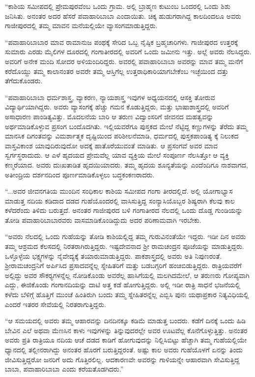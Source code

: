  “ಕಾಶಿಯ ಸಮೀಪದಲ್ಲಿ ಪ್ರೇಮಪುರವೆಂಬ ಒಂದು ಗ್ರಾಮ. ಅಲ್ಲಿ ಬ್ರಾಹ್ಮಣ ಕುಟುಂಬ ಒಂದರಲ್ಲಿ ಒಂದು ಶಿಶು ಜನಿಸಿತು. ಅನಂತರ ಅದರ ಹೆಸರೆ ಪವಾಹಾರಿಬಾಬಾ ಎಂದಾಯಿತು. ಚಿಕ್ಕ ಹುಡುಗರಾಗಿದ್ದ ಕಾಲದಿಂದಲೂ ಅವರು ಗಾಜೀಪುರದಲ್ಲಿ ತಮ್ಮ ಮಾವನ ಮನೆಯಲ್ಲಿಯೇ ವ್ಯಾಸಂಗಮಾಡುತ್ತಿದ್ದರು.

 “ಪವಾಹಾರಿಬಾಬಾರ ಮಾವ ರಾಮಾನುಜ ಪಂಥಕ್ಕೆ ಸೇರಿದ ಒಬ್ಬ ನೈಷ್ಠಿಕ ಬ್ರಹ್ಮಚಾರಿಗಳು. ಗಾಜೀಪುರದ ಉತ್ತರಕ್ಕೆ ಸುಮಾರು ಎರಡು ಮೈಲಿಗಳ ದೂರದಲ್ಲಿ ಗಂಗಾತೀರದಲ್ಲಿ ಅವರಿಗೆ ಒಂದು ಜಮೀನು ಇತ್ತು. ಅಲ್ಲೆ ಅವರು ನೆಲಸಿದ್ದರು. ಅವರಿಗೆ ಅನೇಕ ಮಂದಿ ಸೋದರ ಅಳಿಯಂದಿರಿದ್ದರು. ಅವರಲ್ಲಿ ಪವಾಹಾರಿಬಾಬಾ ಅವರನ್ನು ಮಾವ ತಮ್ಮ ಮನೆಗೆ ಕರೆದೊಯ್ದು ತಮ್ಮ ಕಾಲಾನಂತರ ಅವರೇ ತಮ್ಮ ಆಸ್ತಿಗೆಲ್ಲ ಉತ್ತರಾಧಿಕಾರಿಯಾಗಬೇಕೆಂಬ ಇಚ್ಛೆಯಿಂದ ದತ್ತು ತೆಗೆದುಕೊಂಡರು.

 “ಪವಾಹಾರಿಬಾಬಾ ಧರ್ಮಶಾಸ್ತ್ರ, ವ್ಯಾಕರಣ, ನ್ಯಾಯಶಾಸ್ತ್ರ ಇವುಗಳ ಅಧ್ಯಯನದಲ್ಲಿ ಆಸಕ್ತಿ ತೋರುವ ವಿದ್ಯಾರ್ಥಿಯಾಗಿದ್ದರು. ಅವರು ವ್ಯಾಸಂಗಕ್ಕೆ ಹೆಚ್ಚು ಗಮನ ಕೊಡುತ್ತಿದ್ದರು, ಮತ್ತು ಭಾಷಾಶಾಸ್ತ್ರದಲ್ಲಿ ಅವರಿಗೆ ಅಸಾಧಾರಣ ಪಾಂಡಿತ್ಯವಿತ್ತು. ಮೊದಲನೆಯ ಬಾರಿ ಆ ತರುಣ ವಿದ್ವಾಂಸರಿಗೆ ಜೀವನದ ಮಹತ್ವವನ್ನು ಅರ್ಥಮಾಡಿಕೊಳ್ಳುವ ಪ್ರಸಂಗ ಬಂದೊದಗಿತು. ಇಲ್ಲಿಯವರೆಗೂ ಪುಸ್ತಕದ ಮೇಲೆ ನೆಟ್ಟಿದ್ದ ಕಣ್ಣುಗಳನ್ನು ತೆರೆದು ತಮ್ಮ ಮಾನಸಿಕ ದಿಗಂತವನ್ನು ವಿಮರ್ಶಾತ್ಮಕ ದೃಷ್ಟಿಯಿಂದ ಪರಿಶೀಲನೆಮಾಡಿ, ಧರ್ಮದಲ್ಲಿ ಪುಸ್ತಕಪಾಂಡಿತ್ಯ ಕ್ಕೆ ನಿಲುಕದ ವಾಸ್ತವಿಕಾಂಶ ಯಾವುದಿರುವುದೋ ಅದಕ್ಕೆ ಹಾತೊರೆಯುವಂತೆ ಮಾಡಿತು. ಆ ಪ್ರಸಂಗವೆ ಅವರ ಮಾವ ಸ್ವರ್ಗಸ್ಥರಾದುದು. ಆ ಎಳೆ ಹೃದಯದ ಪ್ರೇಮವೆಲ್ಲ ಯಾವ ವ್ಯಕ್ತಿಯ ಮೇಲೆ ಸಂಪೂರ್ಣ ನೆಲಸಿತ್ತೋ ಆ ವ್ಯಕ್ತಿ ಕಣ್ಮರೆಯಾದ. ಅವರು ದುಃಖತಾಡಿತ ಹೃದಯಿಯಾದರು. ತಮ್ಮ ಹೃದಯ ಶೂನ್ಯತೆಯನ್ನು ಎಂದೆಂದಿಗೂ ನಾಶವಾಗದ, ಅತೀಂದ್ರಿಯ ದರ್ಶನದಿಂದ ಪೂರ್ಣಮಾಡಿಕೊಳ್ಳಲು ಬದ್ಧಕಂಕಣರಾದರು.

 “...ಅವರ ಜೀವನಗತಿಯ ಮುಂದಿನ ಸಂಧಿಕಾಲ ಕಾಶಿಯ ಸಮೀಪದ ಗಂಗಾ ತೀರದಲ್ಲಿದೆ. ಅಲ್ಲಿ ಯೋಗಾಭ್ಯಾಸ ಮಾಡುತ್ತ ನದಿಯ ಕಡಿದಾದ ದಡದ ಗುಹೆಯೊಂದರಲ್ಲಿ ವಾಸಿಸುತ್ತಿದ್ದ ಸಂನ್ಯಾಸಿಯೊಬ್ಬರ ಶಿಷ್ಯರಾಗಿ ಕೆಲವು ಕಾಲ ಕಳೆದರೆಂದು ತಿಳಿದು ಬರುತ್ತದೆ. ಅನಂತರ ಗಾಜೀಪುರದ ಬಳಿ ಗಂಗಾತೀರದ ನೆಲದಲ್ಲಿ ಒಂದು ದೊಡ್ಡ ಗುಂಡಿಯನ್ನು ತೋಡಿ ಪವಾಹಾರಿಬಾಬಾರವರು ವಾಸಮಾಡಿಕೊಂಡಿದ್ದುದು ಅದರ ಪರಿಣಾಮವಾಗಿ ಇರಬೇಕು.

 “ಅವರು ನೆಲದಲ್ಲಿ ಒಂದು ಗುಹೆಯನ್ನು ತೋಡಿ ಕಾಶಿಯಲ್ಲಿದ್ದ ತಮ್ಮ ಗುರುವಿನಂತೆಯೇ ಇದ್ದರು. ಇಡೀ ದಿನ ಅವರು ತಮ್ಮ ಆಶ್ರಮದ ಕೆಲಸದಲ್ಲಿ ನಿರತರಾಗಿರುತ್ತಿದ್ದರು. ಇಷ್ಟದೇವನಾದ ಶ‍್ರೀ ರಾಮಚಂದ್ರನ ಪೂಜೆಯನ್ನು ಮಾಡುತ್ತಿದ್ದರು. ಒಳ್ಳೊಳ್ಳೆಯ ಭಕ್ಷ್ಯಗಳನ್ನು ನೈವೇದ್ಯಕ್ಕೆ ತಯಾರುಮಾಡುತ್ತಿದ್ದರು. ಪಾಕಶಾಸ್ತ್ರದಲ್ಲಿ ಅವರು ಅತಿ ನಿಪುಣರಂತೆ. ಶ‍್ರೀರಾಮಚಂದ್ರನಿಗೆ ಅರ್ಪಿಸಿದ ಪ್ರಸಾದವನ್ನೆಲ್ಲ ಸ್ನೇಹಿತರಿಗೆ ಮತ್ತು ಬಡಬಗ್ಗರಿಗೆ ಹಂಚಿಬಿಡುತ್ತಿದ್ದರು. ರಾತ್ರಿಯವರೆಗೆ ಅಲ್ಲಿದ್ದು ಅವರ ಸೌಕರ‍್ಯಗಳನ್ನೆಲ್ಲ ನೋಡಿಕೊಂಡು ಅವರೆಲ್ಲ ಹಾಸಿಗೆಯಲ್ಲಿ ಮಲಗಿದಮೇಲೆ, ಆ ತರುಣರು ಗೋಪ್ಯವಾಗಿ ಎದ್ದು, ಈಜಿಕೊಂಡು ಗಂಗಾನದಿಯನ್ನು ದಾಟಿ ಅತ್ತ ಕಡೆ ಹೋಗುತ್ತಿದ್ದರು. ಅಲ್ಲಿ ಇಡೀ ರಾತ್ರಿ ಸಾಧನೆ ಭಜನೆಯಲ್ಲಿ ಕಳೆದು ಬೆಳಿಗ್ಗೆ ಹೊತ್ತಿಗೆ ಮುಂಚೆ ಹಿಂತಿರುಗಿ ಬಂದು ತಮ್ಮ ಸ್ನೇಹಿತರನ್ನೆಲ್ಲ ಎಬ್ಬಿಸಿ ಪುನಃ ಯಥಾಪ್ರಕಾರ ನಿತ್ಯವಿಧಿಯಲ್ಲಿ ಎಂದರೆ ಇತರರ ಸೇವೆಯಲ್ಲಿ ನಿರತರಾಗುತ್ತಿದ್ದರು.

 “ಆ ಸಮಯದಲ್ಲಿ ಅವರು ತಮ್ಮ ಆಹಾರವನ್ನು ದಿನದಿನಕ್ಕೂ ಕಡಿಮೆ ಮಾಡುತ್ತ ಬಂದರು. ಕಡೆಗೆ ದಿನಕ್ಕೆ ಒಂದು ಹಿಡಿ ಬೇವಿನ ಎಲೆ ಅಥವಾ ಮೆಣಸಿನ ಕಾಳು ಇವುಗಳನ್ನು ತಿನ್ನುವುದರಲ್ಲೇ ಅವರ ಊಟವೆಲ್ಲ ಕೊನೆಗೊಳ್ಳುತ್ತಿತ್ತು. ಅನಂತರ ಅವರು ಪ್ರತಿ ರಾತ್ರಿಯೂ ನದಿಯ ಆಚೆ ದಡದ ಕಾಡಿಗೆ ಹೋಗುವುದನ್ನು ನಿಲ್ಲಿಸಿಬಿಟ್ಟು ಹೆಚ್ಚಾಗಿ ತಮ್ಮ ಗುಹೆಯಲ್ಲಿಯೇ ಧ್ಯಾನದಲ್ಲಿ ತಲ್ಲೀನರಾಗಿದ್ದು ಅನಂತರ ಹೊರಗೆ ಬರುತ್ತಿದ್ದರಂತೆ. ಅಷ್ಟು ಕಾಲ ಅವರು ಗುಹೆಯೊಳಗೆ ಏನನ್ನು ತಿಂದು ಜೀವಿಸುತ್ತಿದ್ದರೋ ಜನರಿಗೆ ಅದು ಗೊತ್ತಿರಲಿಲ್ಲ. ಆದಕಾರಣವೇ ಅವರನ್ನು ಗಾಳಿಯನ್ನೇ ಆಹಾರವಾಗಿ ಸೇವಿಸುತ್ತಿದ್ದ ಬಾಬಾ, ಪವಾಹಾರಿಬಾಬಾ ಎಂದು ಕರೆಯತೊಡಗಿದರು.” 

